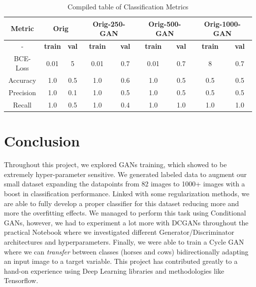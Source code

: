 \documentclass[conference]{IEEEtran}
\begin{document}
\begin{table}[h!]
\centering
\begin{tabular}{| *{9}{c|} }
    \hline
\textbf{Metric}    & \multicolumn{2}{c|}{Orig}
            & \multicolumn{2}{c|}{Orig-250-GAN}
                    & \multicolumn{2}{c|}{Orig-500-GAN}
                            & \multicolumn{2}{c|}{Orig-1000-GAN}                \\
    \hline
-   &   \textbf{train}  &   \textbf{val}  &   \textbf{train}  &   \textbf{val}  &   \textbf{train}  &   \textbf{val}  &   \textbf{train}  &   \textbf{val}  \\
    \hline
BCE-Loss   &   0.01  &   5  &   0.01  &   0.7  &  0.01   &  0.7   &   8  &  0.7   \\
    \hline
Accuracy   &    1.0   &     0.5  &   1.0    &     0.6  &   1.0    &    0.5   &   0.5    &   0.5    \\
    \hline
Precision   &   1.0    &   0.1    &   1.0    &    0.5   &   1.0    &    0.5   &   0.5    &    0.5   \\
    \hline
Recall   &    1.0   &    0.5   &    1.0   &   0.4   &    1.0   &    1.0   &    1.0   &  1.0     \\
    \hline

\end{tabular}
\caption{Compiled table of Classification Metrics}
\end{table}

\section{Conclusion}
Throughout this project, we explored GANs training, which showed to be extremely hyper-parameter sensitive. We generated labeled data to augment our small dataset expanding the datapoints from 82 images to 1000+ images with a boost in classification performance. Linked with some regularization methods, we are able to fully develop a proper classifier for this dataset reducing more and more the overfitting effects. We managed to perform this task using Conditional GANs, however, we had to experiment a lot more with DCGANs throughout the practical Notebook where we investigated different Generator/Discriminator architectures and hyperparameters. Finally, we were able to train a Cycle GAN where we can \textit{transfer} between classes (horses and cows) bidirectionally adapting an input image to a target variable. This project has contributed greatly to a hand-on experience using Deep Learning libraries and methodologies like Tensorflow.


\end{document}
